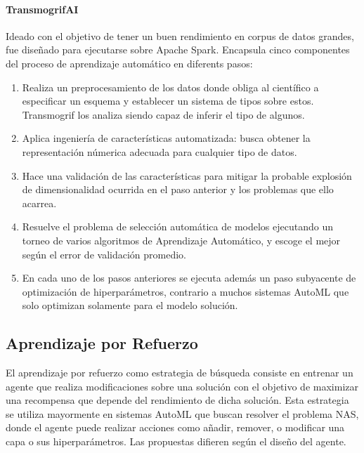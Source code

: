         \paragraph{TransmogrifAI }  Ideado con el objetivo de tener un buen rendimiento en corpus de datos grandes, fue dise\~nado para ejecutarse sobre Apache Spark. Encapsula cinco componentes del proceso de aprendizaje autom\'atico en diferents pasos:
        \begin{enumerate}
            \item Realiza un preprocesamiento de los datos donde obliga al cient\'ifico a especificar un esquema y establecer un sistema de tipos sobre estos. Transmogrif los analiza siendo capaz de inferir el tipo de algunos.
            \item Aplica ingenier\'ia de caracter\'isticas automatizada: busca obtener la representaci\'on n\'umerica adecuada para cualquier tipo de datos.
            \item Hace una validaci\'on de las caracter\'isticas para mitigar la probable explosi\'on de dimensionalidad ocurrida en el paso anterior y los problemas que ello acarrea.
            \item Resuelve el problema de selecci\'on autom\'atica de modelos ejecutando un torneo de varios algoritmos de Aprendizaje Autom\'atico, y escoge el mejor seg\'un el error de validaci\'on promedio.
            \item En cada uno de los pasos anteriores se ejecuta adem\'as un paso subyacente de optimizaci\'on de hiperpar\'ametros, contrario a  muchos sistemas AutoML que solo optimizan solamente para el modelo soluci\'on. 
        \end{enumerate}


\subsection{Aprendizaje por Refuerzo}
El aprendizaje por refuerzo como estrategia de b\'usqueda consiste en entrenar un agente que realiza modificaciones sobre una soluci\'on con el objetivo de maximizar una recompensa que depende del rendimiento de dicha soluci\'on. Esta estrategia se utiliza mayormente en sistemas AutoML que buscan resolver el problema NAS, donde el agente puede realizar acciones como a\~nadir, remover, o modificar una capa o sus hiperpar\'ametros. Las propuestas difieren seg\'un el dise\~no del agente.


